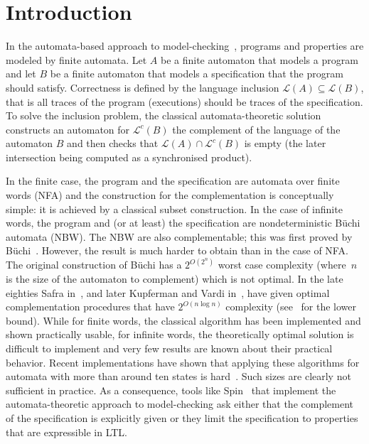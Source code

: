 \documentclass{LMCS}
\renewcommand{\L}{\mathcal{L}}
\begin{document}
\section{Introduction}

In the automata-based approach to model-checking~\cite{vw86,vw94},
programs and properties are modeled by finite automata. Let $A$ be a
finite automaton that models a program and let $B$ be a finite
automaton that models a specification that the program should satisfy.
Correctness is defined by the language inclusion $\L(A) \subseteq \L(B)$,
that is all traces of the program (executions) should be traces of the
specification.  To solve the inclusion problem, the classical automata-theoretic 
solution constructs an automaton for $\L^c(B)$ the complement of
the language of the automaton $B$ and then checks
that $\L(A) \cap {\L^c(B)}$ is empty (the later intersection being
computed as a synchronised product).  

In the finite case, the program and the specification are
automata over finite words (NFA) and the construction for the
complementation is conceptually simple: it is achieved by a classical
subset construction.  In the case of infinite words, the program and
(or at least) the specification are nondeterministic B\"uchi automata
(NBW). The NBW are also complementable; this was first proved
by B\"uchi~\cite{buechi62}.  However, the result is
much harder to obtain than in the case of NFA.  The original
construction of B\"uchi has a $2^{O({2^n})}$ worst case complexity (where~$n$ 
is the size of the automaton to complement) which is not optimal.
In the late eighties Safra in~\cite{Safra88}, and later Kupferman and
Vardi in~\cite{kupferman97weak}, have given optimal complementation
procedures that have $2^{O({n \log n})}$ complexity (see~\cite{Michel88} for the
lower bound).  While for finite words, the classical algorithm
has been implemented and shown practically usable, for infinite
words, the theoretically optimal solution is difficult to
implement and very few results are known about their practical
behavior. 
Recent implementations have shown that applying these algorithms for automata 
with more than around ten states is hard~\cite{TabakovV07,GurumurthyKSV03}.
Such sizes are clearly not sufficient in practice. 
As a consequence, tools like {\sc Spin}~\cite{spin} that
implement the automata-theoretic approach to model-checking ask
either that the complement of the specification is explicitly given
or they limit the specification to properties that are expressible in {\sc LTL}.
\end{document}
